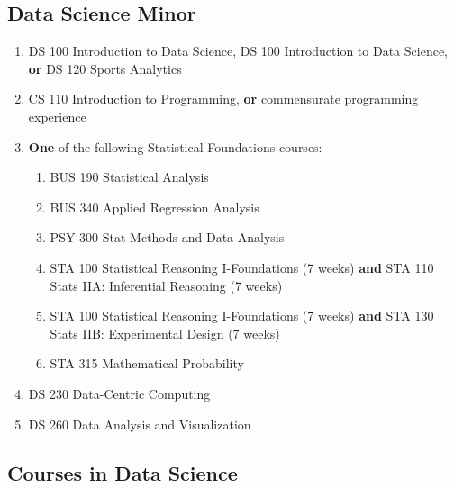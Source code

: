 \documentclass[
  letterpaper,
]{scrbook}
\providecommand{\tightlist}{%
  \setlength{\itemsep}{0pt}\setlength{\parskip}{0pt}}
\begin{document}
\subsection{Data Science Minor}\label{data-science-minor}

\begin{enumerate}
\def\labelenumi{\arabic{enumi}.}
\tightlist
\item
  DS 100 Introduction to Data Science, DS 100 Introduction to Data
  Science, \textbf{or} DS 120 Sports Analytics\\
\item
  CS 110 Introduction to Programming, \textbf{or} commensurate
  programming experience\\
\item
  \textbf{One} of the following Statistical Foundations courses:

  \begin{enumerate}
  \def\labelenumii{\alph{enumii}.}
  \tightlist
  \item
    BUS 190 Statistical Analysis\\
  \item
    BUS 340 Applied Regression Analysis\\
  \item
    PSY 300 Stat Methods and Data Analysis\\
  \item
    STA 100 Statistical Reasoning I-Foundations (7 weeks) \textbf{and}
    STA 110 Stats IIA: Inferential Reasoning (7 weeks)\\
  \item
    STA 100 Statistical Reasoning I-Foundations (7 weeks) \textbf{and}
    STA 130 Stats IIB: Experimental Design (7 weeks)\\
  \item
    STA 315 Mathematical Probability\\
  \end{enumerate}
\item
  DS 230 Data-Centric Computing\\
\item
  DS 260 Data Analysis and Visualization
\end{enumerate}

\subsection{Courses in Data Science}\label{courses-in-data-science}
\end{document}
